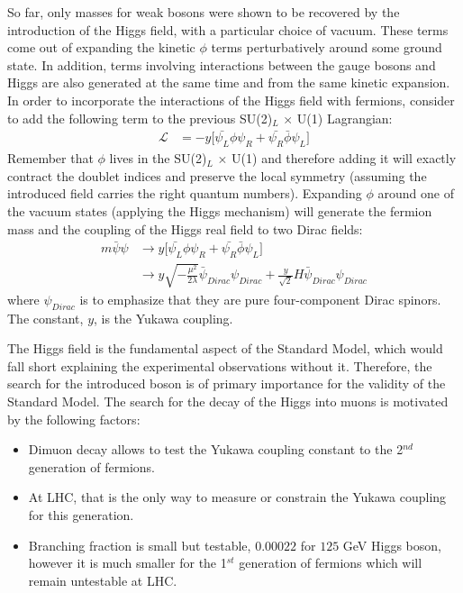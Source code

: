 So far, only masses for weak bosons were shown to be recovered by the introduction of the Higgs field, with a particular choice of vacuum. These terms come out of expanding the kinetic $\phi$ terms perturbatively around some ground state. In addition, terms involving interactions between the gauge bosons and Higgs are also generated at the same time and from the same kinetic expansion. In order to incorporate the interactions of the Higgs field with fermions, consider to add the following term to the previous SU(2)$_L$ $\times$ U(1) Lagrangian:
\begin{subequations}\label{eq:higgs_introduction_fermionmasses}
\begin{align}
    \mathcal{L}& = - y \lbrack \bar{\psi_L}\phi\psi_R + \bar{\psi_R}\bar{\phi}\psi_L \rbrack
\end{align}
\end{subequations}
Remember that $\phi$ lives in the SU(2)$_L$ $\times$ U(1) and therefore adding it will exactly contract the doublet indices and preserve the local symmetry (assuming the introduced field carries the right quantum numbers). Expanding $\phi$ around one of the vacuum states (applying the Higgs mechanism) will generate the fermion mass and the coupling of the Higgs real field to two Dirac fields:
\begin{subequations}\label{eq:higgs_introduction_fermionmassterms}
\begin{align}
    m\bar{\psi}\psi& \rightarrow y \lbrack \bar{\psi_L}\phi\psi_R + \bar{\psi_R}\bar{\phi}\psi_L \rbrack\\
    & \rightarrow y\sqrt{-\frac{\mu^2}{2\lambda}}\bar{\psi}_{Dirac}\psi_{Dirac} + \frac{y}{\sqrt{2}}H\bar{\psi}_{Dirac}\psi_{Dirac}
\end{align}
\end{subequations}
where $\psi_{Dirac}$ is to emphasize that they are pure four-component Dirac spinors. The constant, $y$, is the Yukawa coupling.

The Higgs field is the fundamental aspect of the Standard Model, which would fall short explaining the experimental observations without it. Therefore, the search for the introduced boson is of primary importance for the validity of the Standard Model. The search for the decay of the Higgs into muons is motivated by the following factors:
\begin{itemize}
    \item Dimuon decay allows to test the Yukawa coupling constant to the 2$^{nd}$ generation of fermions.
    \item At LHC, that is the only way to measure or constrain the Yukawa coupling for this generation.
    \item Branching fraction is small but testable, $0.00022$ for $125$ GeV Higgs boson, however it is much smaller for the 1$^{st}$ generation of fermions which will remain untestable at LHC.
\end{itemize}